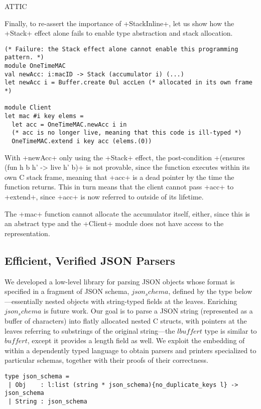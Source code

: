 ATTIC

Finally, to re-assert the importance of \li+StackInline+, let us show how the
\li+Stack+ effect alone fails to enable type abstraction and stack allocation.

\begin{lstlisting}
(* Failure: the Stack effect alone cannot enable this programming pattern. *)
module OneTimeMAC
val newAcc: i:macID -> Stack (accumulator i) (...)
let newAcc i = Buffer.create 0ul accLen (* allocated in its own frame *)

module Client
let mac #i key elems =
  let acc = OneTimeMAC.newAcc i in
  (* acc is no longer live, meaning that this code is ill-typed *)
  OneTimeMAC.extend i key acc (elems.(0))
\end{lstlisting}

With \li+newAcc+ only using the \li+Stack+ effect, the post-condition
\li+(ensures (fun h b h' -> live h' b)+ is not provable, since the function
executes within its own C stack frame, meaning that \li+acc+ is a dead pointer
by the time the function returns. This in turn means that the client cannot pass
\li+acc+ to \li+extend+, since \li+acc+ is now referred to outside of its
lifetime.

The \li+mac+ function cannot allocate the accumulator itself, either, since this
is an abstract type and the \li+Client+ module does not have access to the
representation.
\fi

\iffalse
\subsection{Efficient, Verified JSON Parsers}
\label{sec:jsonparsing}

We developed a low-level library for parsing JSON objects whose format
is specified in a fragment of JSON schema, \lst$json_schema$, defined by
the type below---essentially nested objects with string-typed fields
at the leaves. Enriching \lst$json_schema$ is future work.
%
Our goal is to parse a JSON string (represented as a buffer of
characters) into flatly allocated nested C structs, with pointers at
the leaves referring to substrings of the original string---the
\lst$lbuffer t$ type is similar to \lst$buffer t$, except it provides
a length field as well.
%
We exploit the embedding of \lowstar within a dependently typed
language to obtain parsers and printers specialized to particular
schemas, together with their proofs of their correctness.

\begin{lstlisting}
type json_schema =
 | Obj    : l:list (string * json_schema){no_duplicate_keys l} -> json_schema
 | String : json_schema
\end{lstlisting}

